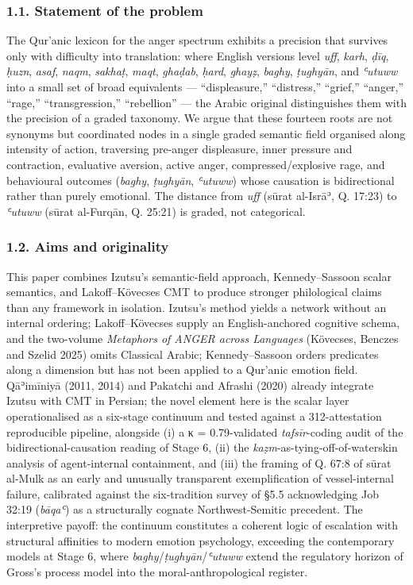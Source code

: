 \documentclass[11pt,a4paper]{article}
\begin{document}
\subsubsection{1.1. Statement of the
problem}\label{statement-of-the-problem}

The Qur'anic lexicon for the anger spectrum exhibits a precision that
survives only with difficulty into translation: where English versions
level \emph{uff}, \emph{karh}, \emph{ḍīq}, \emph{ḥuzn}, \emph{asaf},
\emph{naqm}, \emph{sakhaṭ}, \emph{maqt}, \emph{ghaḍab}, \emph{ḥard},
\emph{ghayẓ}, \emph{baghy}, \emph{ṭughyān}, and \emph{ʿutuww} into a
small set of broad equivalents --- ``displeasure,'' ``distress,''
``grief,'' ``anger,'' ``rage,'' ``transgression,'' ``rebellion'' --- the
Arabic original distinguishes them with the precision of a graded
taxonomy. We argue that these fourteen roots are not synonyms but
coordinated nodes in a single graded semantic field organised along
intensity of action, traversing pre-anger displeasure, inner pressure
and contraction, evaluative aversion, active anger, compressed/explosive
rage, and behavioural outcomes (\emph{baghy}, \emph{ṭughyān},
\emph{ʿutuww}) whose causation is bidirectional rather than purely
emotional. The distance from \emph{uff} (sūrat al-Isrāʾ, Q. 17:23) to
\emph{ʿutuww} (sūrat al-Furqān, Q. 25:21) is graded, not categorical.

\subsubsection{1.2. Aims and originality}\label{aims-and-originality}

This paper combines Izutsu's semantic-field approach, Kennedy--Sassoon
scalar semantics, and Lakoff--Kövecses CMT to produce stronger
philological claims than any framework in isolation. Izutsu's method
yields a network without an internal ordering; Lakoff--Kövecses supply
an English-anchored cognitive schema, and the two-volume \emph{Metaphors
of ANGER across Languages} (Kövecses, Benczes and Szelid 2025) omits
Classical Arabic; Kennedy--Sassoon orders predicates along a dimension
but has not been applied to a Qur'anic emotion field. Qāʾimīniyā (2011,
2014) and Pakatchi and Afrashi (2020) already integrate Izutsu with CMT
in Persian; the novel element here is the scalar layer operationalised
as a six-stage continuum and tested against a 312-attestation
reproducible pipeline, alongside (i) a κ = 0.79-validated
\emph{tafsīr}-coding audit of the bidirectional-causation reading of
Stage 6, (ii) the \emph{kaẓm}-as-tying-off-of-waterskin analysis of
agent-internal containment, and (iii) the framing of Q. 67:8 of sūrat
al-Mulk as an early and unusually transparent exemplification of
vessel-internal failure, calibrated against the six-tradition survey of
§5.5 acknowledging Job 32:19 (\emph{bāqaʿ}) as a structurally cognate
Northwest-Semitic precedent. The interpretive payoff: the continuum
constitutes a coherent logic of escalation with structural affinities to
modern emotion psychology, exceeding the contemporary models at Stage 6,
where \emph{baghy}/\emph{ṭughyān}/\emph{ʿutuww} extend the regulatory
horizon of Gross's process model into the moral-anthropological
register.
\end{document}
